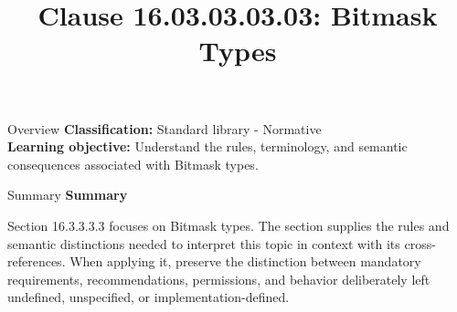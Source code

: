 \documentclass[10pt,letterpaper]{article}
\title{Clause 16.03.03.03.03: Bitmask Types}
\author{}
\date{}
\begin{document}
\maketitle
\begin{CornellOverviewBox}{Overview}
\textbf{Classification:} Standard library - Normative\\[2pt]
\textbf{Learning objective:} Understand the rules, terminology, and semantic consequences associated with Bitmask types.
\end{CornellOverviewBox}\begin{CornellSummaryBox}{Summary}
{\sffamily\bfseries\color{Accent} Summary}\par\vspace{3pt}Section 16.3.3.3.3 focuses on Bitmask types. The section supplies the rules and semantic distinctions needed to interpret this topic in context with its cross-references. When applying it, preserve the distinction between mandatory requirements, recommendations, permissions, and behavior deliberately left undefined, unspecified, or implementation-defined.
\end{CornellSummaryBox}
\end{document}
